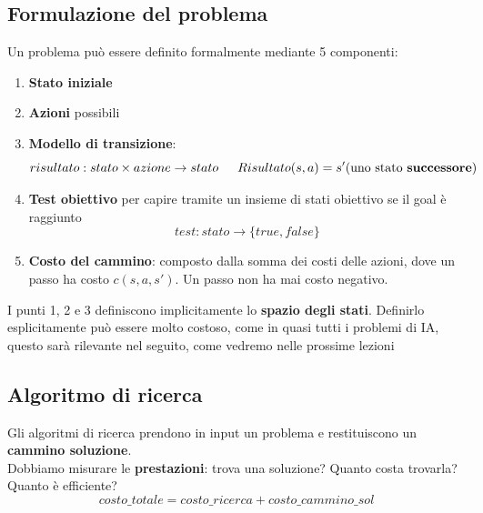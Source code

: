 \subsection{Formulazione del problema}
Un problema può essere definito formalmente mediante 5 componenti:
\begin{enumerate}
	\item \textbf{Stato iniziale}
	\item \textbf{Azioni} possibili
	\item \textbf{Modello di transizione}: $$risultato: stato \times azione \to stato \hspace{15pt} Risultato(s,a)=s' (\text{uno stato \textbf{successore}})$$
	\item \textbf{Test obiettivo} per capire tramite un insieme di stati obiettivo se il goal è raggiunto $$test: stato \to \{true,false\}$$
	\item \textbf{Costo del cammino}: composto dalla somma dei costi delle azioni, dove un passo ha costo $c(s,a,s')$. Un passo non ha mai costo negativo.
\end{enumerate}
I punti 1, 2 e 3 definiscono implicitamente lo \textbf{spazio degli stati}. Definirlo esplicitamente può essere molto costoso, come
in quasi tutti i problemi di IA, questo sarà rilevante nel seguito, come vedremo nelle prossime lezioni

\subsection{Algoritmo di ricerca}
Gli algoritmi di ricerca prendono in input un problema e restituiscono un \textbf{cammino soluzione}.\\
Dobbiamo misurare le \textbf{prestazioni}: trova una soluzione? Quanto costa trovarla? Quanto è efficiente?
\begin{equation*}
	costo\_totale=costo\_ricerca+costo\_cammino\_sol
\end{equation*}

